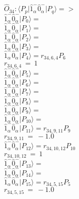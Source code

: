\documentclass[14pt]{article}
\begin{document}
    $\hat{O}_{34}:  \langle{P_p}\vert \hat{1}_{\alpha}^{-}\hat{0}_{\alpha}^{-} \vert{P_q}\rangle => $ \\ 
    $ \hat{1}_{\alpha}^{-}\hat{0}_{\alpha}^{-} \vert{P_{0}}\rangle =  $ \\ 
    $ \hat{1}_{\alpha}^{-}\hat{0}_{\alpha}^{-} \vert{P_{1}}\rangle =  $ \\ 
    $ \hat{1}_{\alpha}^{-}\hat{0}_{\alpha}^{-} \vert{P_{2}}\rangle =  $ \\ 
    $ \hat{1}_{\alpha}^{-}\hat{0}_{\alpha}^{-} \vert{P_{3}}\rangle =  $ \\ 
    $ \hat{1}_{\alpha}^{-}\hat{0}_{\alpha}^{-} \vert{P_{4}}\rangle = {r}_{34,6,4}P_{6} $ \\ 
    ${r}_{34,6,4}\ =\ 1 $ \\ 
    $ \hat{1}_{\alpha}^{-}\hat{0}_{\alpha}^{-} \vert{P_{5}}\rangle =  $ \\ 
    $ \hat{1}_{\alpha}^{-}\hat{0}_{\alpha}^{-} \vert{P_{6}}\rangle =  $ \\ 
    $ \hat{1}_{\alpha}^{-}\hat{0}_{\alpha}^{-} \vert{P_{7}}\rangle =  $ \\ 
    $ \hat{1}_{\alpha}^{-}\hat{0}_{\alpha}^{-} \vert{P_{8}}\rangle =  $ \\ 
    $ \hat{1}_{\alpha}^{-}\hat{0}_{\alpha}^{-} \vert{P_{9}}\rangle =  $ \\ 
    $ \hat{1}_{\alpha}^{-}\hat{0}_{\alpha}^{-} \vert{P_{10}}\rangle =  $ \\ 
    $ \hat{1}_{\alpha}^{-}\hat{0}_{\alpha}^{-} \vert{P_{11}}\rangle = {r}_{34,9,11}P_{9} $ \\ 
    ${r}_{34,9,11}\ =\ -1.0 $ \\ 
    $ \hat{1}_{\alpha}^{-}\hat{0}_{\alpha}^{-} \vert{P_{12}}\rangle = {r}_{34,10,12}P_{10} $ \\ 
    ${r}_{34,10,12}\ =\ 1 $ \\ 
    $ \hat{1}_{\alpha}^{-}\hat{0}_{\alpha}^{-} \vert{P_{13}}\rangle =  $ \\ 
    $ \hat{1}_{\alpha}^{-}\hat{0}_{\alpha}^{-} \vert{P_{14}}\rangle =  $ \\ 
    $ \hat{1}_{\alpha}^{-}\hat{0}_{\alpha}^{-} \vert{P_{15}}\rangle = {r}_{34,5,15}P_{5} $ \\ 
    ${r}_{34,5,15}\ =\ -1.0 $ \\ 
    
\end{document}
